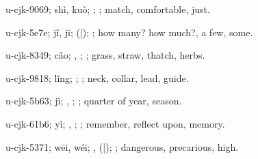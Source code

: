 \begin{multicols}{2}
{\cjkgGlue{}u-cjk-9069; shì, kuò; \cjkgGlue{}\cjkgGlue{}\cjkgGlue{}; \cjkgGlue{}; match, comfortable, just.

\cjkgGlue{}u-cjk-5e7e; jǐ, jī; \cjkgGlue{}\cjkgGlue{}(\cjkgGlue{}|\cjkgGlue{}); \cjkgGlue{}; how many? how much?, a few, some.

\cjkgGlue{}u-cjk-8349; cǎo; \cjkgGlue{}, \cjkgGlue{}; \cjkgGlue{}; grass, straw, thatch, herbs.

\cjkgGlue{}u-cjk-9818; lǐng; \cjkgGlue{}; \cjkgGlue{}; neck, collar, lead, guide.

\cjkgGlue{}u-cjk-5b63; jì; \cjkgGlue{}, \cjkgGlue{}; \cjkgGlue{}; quarter of year, season.

\cjkgGlue{}u-cjk-61b6; yì; \cjkgGlue{}, \cjkgGlue{}; \cjkgGlue{}; remember, reflect upon, memory.

\cjkgGlue{}u-cjk-5371; wēi, wéi; \cjkgGlue{}\cjkgGlue{}\cjkgGlue{}, \cjkgGlue{}\cjkgGlue{}(\cjkgGlue{}|\cjkgGlue{}); \cjkgGlue{}; dangerous, precarious, high.

}
\end{multicols}
